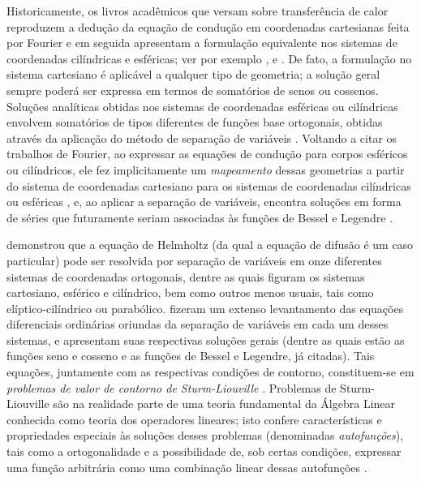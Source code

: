 Historicamente, os livros acadêmicos que versam sobre transferência de calor reproduzem a dedução da equação de condução em coordenadas
cartesianas feita por Fourier e em seguida apresentam a formulação equivalente nos sistemas de coordenadas cilíndricas e esféricas; ver
por exemplo \cite{livro_carslaw}, \cite{livro_holman} e \cite{livro_ozisik}. De fato, a formulação no sistema cartesiano é aplicável
a qualquer tipo de geometria; a solução geral sempre poderá ser expressa em termos de somatórios de senos ou cossenos. Soluções analíticas obtidas
nos sistemas de coordenadas esféricas ou cilíndricas envolvem somatórios de tipos diferentes de funções base ortogonais, obtidas através da aplicação do método
de separação de variáveis \citep{livro_boyce}. Voltando a citar os trabalhos de Fourier, ao expressar
as equações de condução para corpos esféricos ou cilíndricos, ele fez implicitamente um \textit{mapeamento} dessas geometrias a partir
do sistema de coordenadas cartesiano para os sistemas de coordenadas cilíndricas ou esféricas \citep{livro_numerical_grid}, e, ao aplicar a
separação de variáveis, encontra soluções em forma de séries que futuramente seriam associadas às funções de Bessel e Legendre \citep{livro_fourier}. 

\cite{artigo_einsenhart, artigo_einsenhart_2} demonstrou que a equação de Helmholtz (da qual a equação
de difusão é um caso particular) pode ser resolvida por separação de variáveis em onze diferentes
sistemas de coordenadas ortogonais, dentre as quais figuram os sistemas cartesiano, esférico e cilíndrico, bem como outros menos usuais, tais
como elíptico-cilíndrico ou parabólico. \cite{livro_moon} fizeram um extenso levantamento das equações diferenciais ordinárias
oriundas da separação de variáveis em cada um desses sistemas, e apresentam suas respectivas soluções gerais (dentre as quais estão as funções
seno e cosseno e as funções de Bessel e Legendre, já citadas). Tais equações, juntamente com as respectivas condições de contorno, constituem-se
em \textit{problemas de valor de contorno de Sturm-Liouville} \citep{artigo_sturm, artigo_liouville}. Problemas de Sturm-Liouville são na realidade
parte de uma teoria fundamental da Álgebra Linear conhecida como teoria dos operadores lineares; isto confere características e propriedades
especiais às soluções desses problemas (denominadas \textit{autofunções}), tais como a ortogonalidade e a possibilidade de, sob certas condições, expressar uma função arbitrária
como uma combinação linear dessas autofunções \citep{livro_boyce, livro_axler}.

